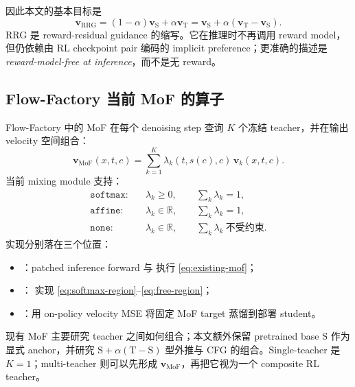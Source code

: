 \documentclass[11pt,a4paper]{article}
\newcommand{\R}{\mathbb{R}}
\newcommand{\MoF}{\mathrm{MoF}}
\newcommand{\vfield}{\bm{v}}
\newcommand{\student}{\mathrm{S}}
\newcommand{\teacher}{\mathrm{T}}
\theoremstyle{definition}
\theoremstyle{plain}
\begin{document}
因此本文的基本目标是
\begin{equation}
  \vfield_{\mathrm{RRG}}
  =
  (1-\alpha)\vfield_\student+\alpha\vfield_\teacher
  =
  \vfield_\student+\alpha(\vfield_\teacher-\vfield_\student).
  \label{eq:rrg-basic}
\end{equation}
RRG 是 reward-residual guidance 的缩写。它在推理时不再调用 reward model，
但仍依赖由 RL checkpoint pair 编码的 implicit preference；更准确的描述是
\emph{reward-model-free at inference}，而不是无 reward。

\subsection{Flow-Factory 当前 MoF 的算子}

Flow-Factory 中的 MoF 在每个 denoising step 查询 $K$ 个冻结 teacher，并在输出
velocity 空间组合：
\begin{equation}
  \vfield_{\MoF}(x,t,c)
  =
  \sum_{k=1}^{K}\lambda_k(t,s(c),c)\,
  \vfield_k(x,t,c).
  \label{eq:existing-mof}
\end{equation}
当前 mixing module 支持：
\begin{align}
  \texttt{softmax}:&\quad
  \lambda_k\geq 0,\qquad \sum_k\lambda_k=1,
  \label{eq:softmax-region}\\
  \texttt{affine}:&\quad
  \lambda_k\in\R,\qquad \sum_k\lambda_k=1,
  \label{eq:affine-region}\\
  \texttt{none}:&\quad
  \lambda_k\in\R,\qquad \sum_k\lambda_k\ \text{不受约束}.
  \label{eq:free-region}
\end{align}
实现分别落在三个位置：
\begin{itemize}[leftmargin=1.6em]
  \item {}：patched inference forward 与
   执行 \eqref{eq:existing-mof}；
  \item {}：
  实现 \eqref{eq:softmax-region}--\eqref{eq:free-region}；
  \item {}：用 on-policy velocity MSE 将固定
  MoF target 蒸馏到部署 student。
\end{itemize}

\begin{tcolorbox}[
  colback=blue!3,
  colframe=blue!45!black,
  title=本文与现有 MoF 的关系]
现有 MoF 主要研究 teacher 之间如何组合；本文额外保留 pretrained base
$\student$ 作为显式 anchor，并研究
$\student+\alpha(\teacher-\student)$ 型外推与 CFG 的组合。Single-teacher
是 $K=1$；multi-teacher 则可以先形成 $\vfield_{\MoF}$，再把它视为一个
composite RL teacher。
\end{tcolorbox}
\end{document}
